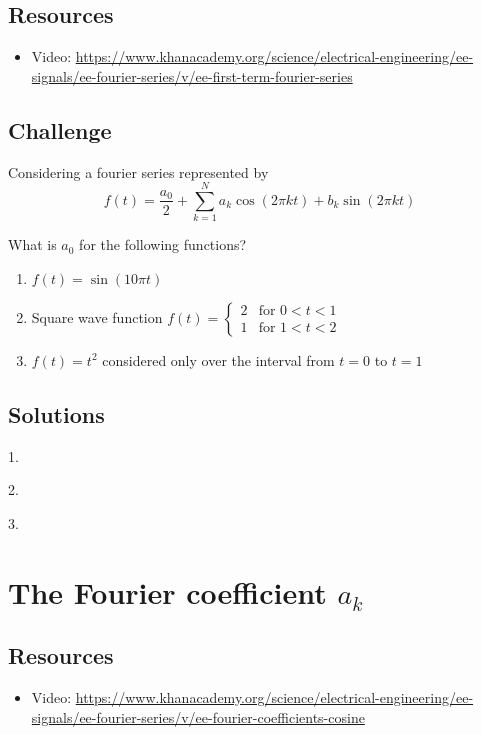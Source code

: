 \subsection*{Resources}
\begin{itemize}
    \item Video: \url{https://www.khanacademy.org/science/electrical-engineering/ee-signals/ee-fourier-series/v/ee-first-term-fourier-series}
\end{itemize}

\subsection*{Challenge}
Considering a fourier series represented by
\begin{equation}
    f(t) = \frac{a_0}{2} + \sum_{k=1}^{N} a_k \cos(2 \pi k t) + b_k \sin(2 \pi k t)
\end{equation}

What is $a_0$ for the following functions?
\begin{enumerate}
    \item $f(t) = \sin(10 \pi t)$
    \item Square wave function $f(t) = \begin{cases} 2 & \text{for } 0<t<1 \\ 1 & \text{for } 1<t<2 \end{cases}$
    \item $f(t) = t^2$ considered only over the interval from $t=0$ to $t=1$
\end{enumerate}

\subsection*{Solutions}
1.\\

2.\\

3.\\




\newpage
\section{The Fourier coefficient $a_k$}

\subsection*{Resources}
\begin{itemize}
    \item Video: \url{https://www.khanacademy.org/science/electrical-engineering/ee-signals/ee-fourier-series/v/ee-fourier-coefficients-cosine}
\end{itemize}

